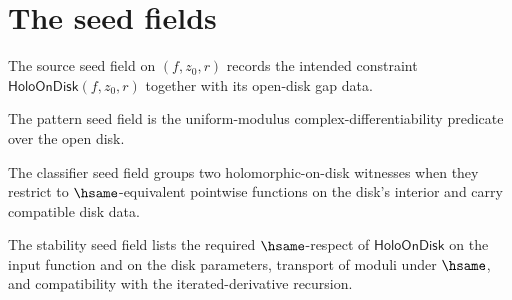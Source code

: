 \section{The seed fields}

\begin{definition}
\label{def:holo-source-spec}
The source seed field on $(f, z_0, r)$ records the intended constraint $\mathsf{HoloOnDisk}(f, z_0, r)$ together with its open-disk gap data.
\end{definition}

\begin{definition}
\label{def:holo-pattern-spec}
The pattern seed field is the uniform-modulus complex-differentiability predicate over the open disk.
\end{definition}

\begin{definition}
\label{def:holo-classifier-spec}
The classifier seed field groups two holomorphic-on-disk witnesses when they restrict to $\hsame$-equivalent pointwise functions on the disk's interior and carry compatible disk data.
\end{definition}

\begin{definition}
\label{def:holo-stability-cert}
The stability seed field lists the required $\hsame$-respect of $\mathsf{HoloOnDisk}$ on the input function and on the disk parameters, transport of moduli under $\hsame$, and compatibility with the iterated-derivative recursion.
\end{definition}

